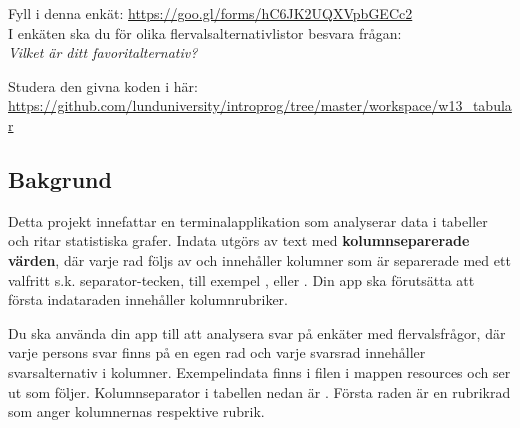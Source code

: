 


\begin{Preparations}
\item Fyll i denna enkät: \url{https://goo.gl/forms/hC6JK2UQXVpbGECc2}  \\
I enkäten ska du för olika flervalsalternativlistor besvara frågan: \\ \textit{Vilket är ditt favoritalternativ?}
\item Studera den givna koden i  här: \url{https://github.com/lunduniversity/introprog/tree/master/workspace/w13_tabular}
\end{Preparations}


\subsection{Bakgrund}

Detta projekt innefattar en terminalapplikation som analyserar data i tabeller och ritar statistiska grafer. Indata utgörs av text med \textbf{kolumnseparerade värden}, där varje rad följs av  och innehåller kolumner som är separerade med ett valfritt s.k. separator-tecken, till exempel ,  eller . Din app ska förutsätta att första indataraden innehåller kolumnrubriker.

Du ska använda din app till att analysera svar på enkäter med flervalsfrågor, där varje persons svar finns på en egen rad och varje svarsrad innehåller svarsalternativ i kolumner.
Exempelindata finns i filen  i mappen resources och ser ut som följer. Kolumnseparator i tabellen nedan är . Första raden är en rubrikrad som anger kolumnernas respektive rubrik.


